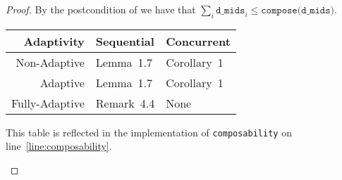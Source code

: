 \documentclass{article}
\begin{document}
\begin{proof}
  By the postcondition of  we have that $\sum_i \texttt{d\_mids}_i \le \texttt{compose(d\_mids)}$.

  \begin{center}
    \begin{tabular}{ r | l l }
      Adaptivity & Sequential & Concurrent \\ 
      \hline
      Non-Adaptive & Lemma~1.7\cite{bun2016concentrated} & Corollary~1\cite{lyu2022interactive} \\  
      Adaptive & Lemma~1.7\cite{bun2016concentrated} & Corollary~1\cite{lyu2022interactive} \\
      Fully-Adaptive & Remark~4.4\cite{feldman2022individual} & None
    \end{tabular}

    This table is reflected in the implementation of \texttt{composability} on line~\ref{line:composability}.
  \end{center}
  
\end{proof}



\end{document}

